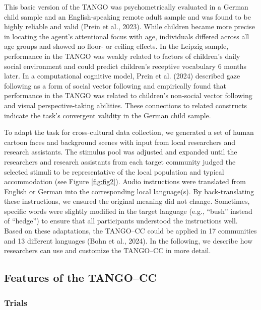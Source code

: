 \documentclass[
  man,floatsintext]{apa7}
\begin{document}
This basic version of the TANGO was psychometrically evaluated in a German child sample and an English-speaking remote adult sample and was found to be highly reliable and valid (Prein et al., 2023).
While children became more precise in locating the agent's attentional focus with age, individuals differed across all age groups and showed no floor- or ceiling effects.
In the Leipzig sample, performance in the TANGO was weakly related to factors of children's daily social environment and could predict children's receptive vocabulary 6 months later.
In a computational cognitive model, Prein et al. (2024) described gaze following as a form of social vector following and empirically found that performance in the TANGO was related to children's non-social vector following and visual perspective-taking abilities.
These connections to related constructs indicate the task's convergent validity in the German child sample.

To adapt the task for cross-cultural data collection, we generated a set of human cartoon faces and background scenes with input from local researchers and research assistants.
The stimulus pool was adjusted and expanded until the researchers and research assistants from each target community judged the selected stimuli to be representative of the local population and typical accommodation (see Figure \ref{fig:fig2}).
Audio instructions were translated from English or German into the corresponding local language(s).
By back-translating these instructions, we ensured the original meaning did not change.
Sometimes, specific words were slightly modified in the target language (e.g., ``bush'' instead of ``hedge'') to ensure that all participants understood the instructions well.
Based on these adaptations, the TANGO--CC could be applied in 17 communities and 13 different languages (Bohn et al., 2024). In the following, we describe how researchers can use and customize the TANGO--CC in more detail.

\subsection{Features of the TANGO--CC}\label{features-of-the-tangocc}

\subsubsection{Trials}\label{trials}
\end{document}
